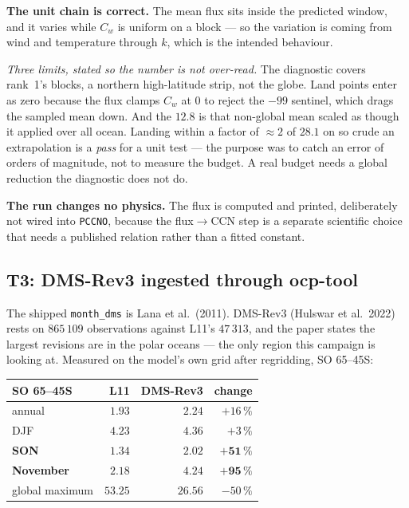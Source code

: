 \documentclass[10pt]{article}
\begin{document}
\noindent \textbf{The unit chain is correct.} The mean flux sits inside the predicted window,
and it varies while $C_w$ is uniform on a block --- so the variation is coming from wind and
temperature through $k$, which is the intended behaviour.

\emph{Three limits, stated so the number is not over-read.} The diagnostic covers rank~1's
blocks, a northern high-latitude strip, not the globe. Land points enter as zero because the
flux clamps $C_w$ at $0$ to reject the $-99$ sentinel, which drags the sampled mean down. And
the $12.8$ is that non-global mean scaled as though it applied over all ocean. Landing within
a factor of ${\approx}2$ of $28.1$ on so crude an extrapolation is a \emph{pass} for a unit
test --- the purpose was to catch an error of orders of magnitude, not to measure the budget.
A real budget needs a global reduction the diagnostic does not do.

\textbf{The run changes no physics.} The flux is computed and printed, deliberately not wired
into \texttt{PCCNO}, because the flux$\to$CCN step is a separate scientific choice that needs
a published relation rather than a fitted constant.

\subsection{T3: DMS-Rev3 ingested through ocp-tool}\label{sub:r24t3}
The shipped \texttt{month\_dms} is Lana et al.\ (2011). DMS-Rev3 (Hulswar et al.\ 2022)
rests on $865\,109$ observations against L11's $47\,313$, and the paper states the largest
revisions are in the polar oceans --- the only region this campaign is looking at.
Measured on the model's own grid after regridding, SO 65--45S:

\begin{center}\footnotesize
\begin{tabular}{l r r r}
\toprule
SO 65--45S & L11 & DMS-Rev3 & change \\
\midrule
annual & $1.93$ & $2.24$ & $+16\,\%$ \\
DJF & $4.23$ & $4.36$ & $+3\,\%$ \\
\textbf{SON} & $\mathbf{1.34}$ & $\mathbf{2.02}$ & $\mathbf{+51\,\%}$ \\
\textbf{November} & $\mathbf{2.18}$ & $\mathbf{4.24}$ & $\mathbf{+95\,\%}$ \\
global maximum & $53.25$ & $26.56$ & $-50\,\%$ \\
\bottomrule
\end{tabular}
\end{center}
\end{document}
